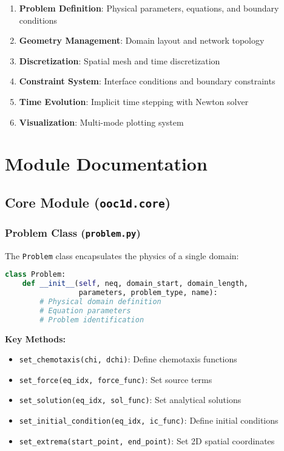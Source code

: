 \documentclass[11pt,a4paper]{article}
\newcommand{\code}[1]{\texttt{#1}}
\begin{document}
\begin{enumerate}
    \item \textbf{Problem Definition}: Physical parameters, equations, and boundary conditions
    \item \textbf{Geometry Management}: Domain layout and network topology
    \item \textbf{Discretization}: Spatial mesh and time discretization 
    \item \textbf{Constraint System}: Interface conditions and boundary constraints
    \item \textbf{Time Evolution}: Implicit time stepping with Newton solver
    \item \textbf{Visualization}: Multi-mode plotting system
\end{enumerate}

\section{Module Documentation}

\subsection{Core Module (\code{ooc1d.core})}

\subsubsection{Problem Class (\code{problem.py})}

The \code{Problem} class encapsulates the physics of a single domain:

\begin{lstlisting}[language=Python, caption={Problem Class Structure}]
class Problem:
    def __init__(self, neq, domain_start, domain_length, 
                 parameters, problem_type, name):
        # Physical domain definition
        # Equation parameters
        # Problem identification
\end{lstlisting}

\textbf{Key Methods:}
\begin{itemize}
    \item \code{set\_chemotaxis(chi, dchi)}: Define chemotaxis functions
    \item \code{set\_force(eq\_idx, force\_func)}: Set source terms
    \item \code{set\_solution(eq\_idx, sol\_func)}: Set analytical solutions
    \item \code{set\_initial\_condition(eq\_idx, ic\_func)}: Define initial conditions
    \item \code{set\_extrema(start\_point, end\_point)}: Set 2D spatial coordinates
\end{itemize}
\end{document}
